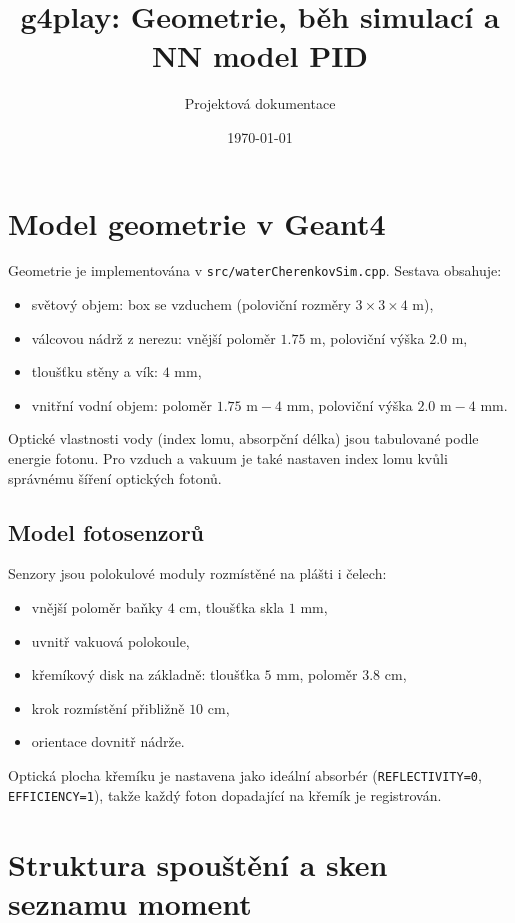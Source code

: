 \documentclass[11pt,a4paper]{article}
\title{g4play: Geometrie, běh simulací a NN model PID}
\author{Projektová dokumentace}
\date{\today}
\begin{document}
\maketitle

\section{Model geometrie v Geant4}
Geometrie je implementována v \texttt{src/waterCherenkovSim.cpp}. Sestava obsahuje:
\begin{itemize}
  \item světový objem: box se vzduchem (poloviční rozměry \(3\times3\times4\) m),
  \item válcovou nádrž z nerezu: vnější poloměr \(1{.}75\) m, poloviční výška \(2{.}0\) m,
  \item tloušťku stěny a vík: \(4\) mm,
  \item vnitřní vodní objem: poloměr \(1{.}75\text{ m}-4\text{ mm}\), poloviční výška \(2{.}0\text{ m}-4\text{ mm}\).
\end{itemize}

Optické vlastnosti vody (index lomu, absorpční délka) jsou tabulované podle energie fotonu. Pro vzduch a vakuum je také nastaven index lomu kvůli správnému šíření optických fotonů.

\subsection{Model fotosenzorů}
Senzory jsou polokulové moduly rozmístěné na plášti i čelech:
\begin{itemize}
  \item vnější poloměr baňky \(4\) cm, tloušťka skla \(1\) mm,
  \item uvnitř vakuová polokoule,
  \item křemíkový disk na základně: tloušťka \(5\) mm, poloměr \(3{.}8\) cm,
  \item krok rozmístění přibližně \(10\) cm,
  \item orientace dovnitř nádrže.
\end{itemize}

Optická plocha křemíku je nastavena jako ideální absorbér
(\texttt{REFLECTIVITY=0}, \texttt{EFFICIENCY=1}), takže každý foton dopadající na křemík je registrován.

\section{Struktura spouštění a sken seznamu moment}
\end{document}
